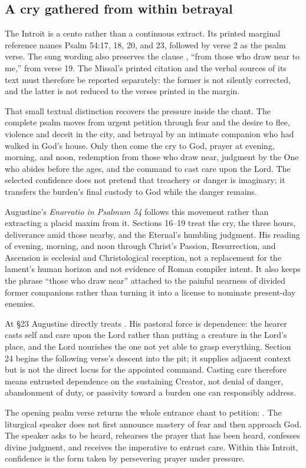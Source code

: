 \subsection*{A cry gathered from within betrayal\enspace{}}

The Introit is a cento rather than a continuous extract. Its printed marginal
reference names Psalm 54:17, 18, 20, and 23, followed by verse 2 as the psalm
verse. The sung wording also preserves the clause , ``from those who draw near to me,'' from verse 19. The
Missal's printed citation and the verbal sources of its text must therefore be
reported separately: the former is not silently corrected, and the latter is
not reduced to the verses printed in the margin.

That small textual distinction recovers the pressure inside the chant. The
complete psalm moves from urgent petition through fear and the desire to flee,
violence and deceit in the city, and betrayal by an intimate companion who had
walked in God's house. Only then come the cry to God, prayer at evening,
morning, and noon, redemption from those who draw near, judgment by the One
who abides before the ages, and the command to cast care upon the Lord. The
selected confidence does not pretend that treachery or danger is imaginary;
it transfers the burden's final custody to God while the danger remains.

Augustine's \emph{Enarratio in Psalmum 54} follows this movement rather than
extracting a placid maxim from it. Sections 16--19 treat the cry, the three
hours, deliverance amid those nearby, and the Eternal's humbling judgment.
His reading of evening, morning, and noon through Christ's Passion,
Resurrection, and Ascension is ecclesial and Christological reception, not a
replacement for the lament's human horizon and not evidence of Roman compiler
intent. It also keeps the phrase ``those who draw near'' attached to the
painful nearness of divided former companions rather than turning it into a
license to nominate present-day enemies.

At §23 Augustine directly treats . His
pastoral force is dependence: the hearer casts self and care upon the Lord
rather than putting a creature in the Lord's place, and the Lord nourishes the
one not yet able to grasp everything. Section 24 begins the following verse's
descent into the pit; it supplies adjacent context but is not the direct locus
for the appointed command. Casting care therefore means entrusted dependence
on the sustaining Creator, not denial of danger, abandonment of duty, or
passivity toward a burden one can responsibly address.

The opening psalm verse returns the whole entrance chant to petition:
. The liturgical speaker does not first
announce mastery of fear and then approach God. The speaker asks to be heard,
rehearses the prayer that has been heard, confesses divine judgment, and
receives the imperative to entrust care. Within this Introit, confidence is
the form taken by persevering prayer under pressure.
